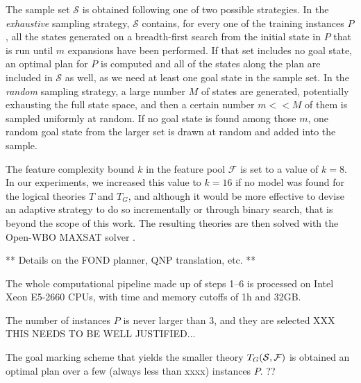 \documentclass[letterpaper]{article} %
\begin{document}
The sample set $\mathcal{S}$ is obtained following one of two possible strategies.
In the \emph{exhaustive} sampling strategy,
$\mathcal{S}$ contains, for every one of the training instances $P$,
all the states generated on a breadth-first search from the initial state in $P$
that is run until $m$ expansions have been performed. If that set includes no goal state,
an optimal plan for $P$ is computed and all of the states along the plan are included in $\mathcal{S}$ as well,
as we need at least one goal state in the sample set.
%
In the \emph{random} sampling strategy, a large number $M$ of states are generated, potentially exhausting the full state space,
and then a certain number $m <\!< M$ of them is sampled uniformly at random. If no goal state is found among those $m$,
one random goal state from the larger set is drawn at random and added into the sample.

The feature complexity bound $k$ in the feature pool $\mathcal{F}$ is set to a value of $k=8$.
In our experiments, we increased this value to $k=16$ if no model was found
for the logical theories $T$ and $T_G$, and although it would be more effective
to devise an adaptive strategy to do so incrementally or through binary search,
that is beyond the scope of this work.
The resulting theories are then solved with the Open-WBO MAXSAT solver \cite{martins2014open}.

** Details on the FOND planner, QNP translation, etc. **

The whole computational pipeline made up of steps 1--6 is processed on Intel Xeon E5-2660 CPUs,
with time and memory cutoffs of 1h and 32GB.

The number of instances $P$ is never larger than $3$, and they are selected XXX THIS NEEDS TO BE WELL JUSTIFIED...



The goal marking scheme that  yields the smaller  theory $T_G({\cal S},{\cal F})$ is obtained an optimal plan over
a few (always less than xxxx) instances $P$. ??
\end{document}
